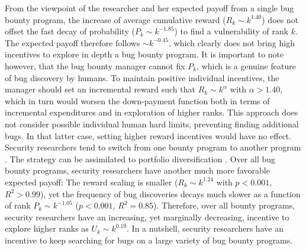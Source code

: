 From the viewpoint of the researcher and her expected payoff from a single bug bounty program, the increase of average cumulative reward ($R_{k} \sim k^{1.40}$) does not offset the fast decay of probability ($P_{k} \sim k^{-1.85}$) to find a vulnerability of rank $k$. The expected payoff therefore follows $\sim k^{-0.45}$, which clearly does not bring high incentives to explore in depth a bug bounty program. It is important to note however, that the bug bounty manager cannot fix $P_k$, which is a genuine feature of bug discovery by humans. To maintain positive individual incentives, the manager should set an incremental reward such that $R_k \sim k^{\alpha}$ with $\alpha > 1.40$, which in turn would worsen the down-payment function both in terms of incremental expenditures and in exploration of higher ranks. This approach does not consider possible individual human hard limits, preventing finding additional bugs. In that latter case, setting higher reward incentives would have no effect.\\

Security researchers tend to switch from one bounty program to another program \cite{zhao2014exploratory,zhao2015empirical}. The strategy can be assimilated to portfolio diversification \cite{goetzmann2008equity}. Over all bug bounty programs, security researchers have another much more favorable expected payoff: The reward scaling is smaller ($R_{k} \sim k^{1.24}$ with $ p < 0.001$, $R^2 > 0.99$), yet the frequency of bug discoveries decays much slower as a function of rank $P_{k} \sim k^{-1.05}$ ($ p < 0.001$, $R^2 = 0.85$). Therefore, over all bounty programs, security researchers have an increasing, yet marginally decreasing, incentive to explore higher ranks as $U_k \sim k^{0.19}$. In a nutshell, security researchers have an incentive to keep searching for bugs on a large variety of bug bounty programs.

